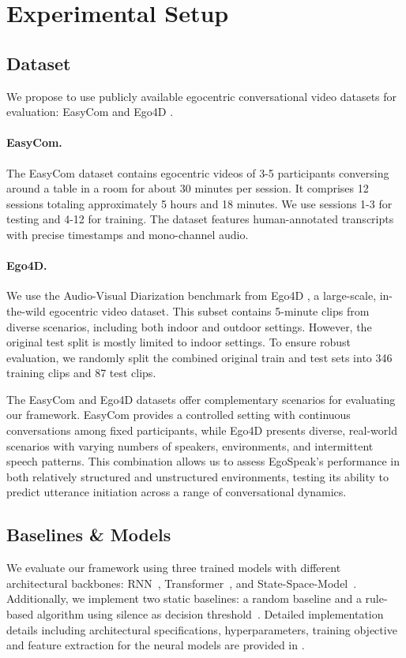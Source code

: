 \section{Experimental Setup}\label{sec:experiments}
\subsection{Dataset}

We propose to use publicly available egocentric conversational video datasets for evaluation: EasyCom \cite{donley2021easycom} and Ego4D \cite{grauman2022ego4d}.

\paragraph{EasyCom.}
The EasyCom dataset contains egocentric videos of 3-5 participants conversing around a table in a room for about 30 minutes per session. It comprises 12 sessions totaling approximately 5 hours and 18 minutes. We use sessions 1-3 for testing and 4-12 for training. The dataset features human-annotated transcripts with precise timestamps and mono-channel audio.

\paragraph{Ego4D.}
We use the Audio-Visual Diarization benchmark from Ego4D \cite{grauman2022ego4d}, a large-scale, in-the-wild egocentric video dataset. This subset contains 5-minute clips from diverse scenarios, including both indoor and outdoor settings. However, the original test split is mostly limited to indoor settings. To ensure robust evaluation, we randomly split the combined original train and test sets into 346 training clips and 87 test clips.

The EasyCom and Ego4D datasets offer complementary scenarios for evaluating our framework. EasyCom provides a controlled setting with continuous conversations among fixed participants, while Ego4D presents diverse, real-world scenarios with varying numbers of speakers, environments, and intermittent speech patterns. This combination allows us to assess EgoSpeak's performance in both relatively structured and unstructured environments, testing its ability to predict utterance initiation across a range of conversational dynamics.





\subsection{Baselines \& Models}
We evaluate our framework using three trained models with different architectural backbones: RNN~\cite{an2023miniroad}, Transformer~\cite{xu2021longlstr}, and State-Space-Model~\cite{gu2023mamba}. Additionally, we implement two static baselines: a random baseline and a rule-based algorithm using silence as decision threshold~\cite{bell2001real}. Detailed implementation details including architectural specifications, hyperparameters, training objective and feature extraction for the neural models are provided in .


